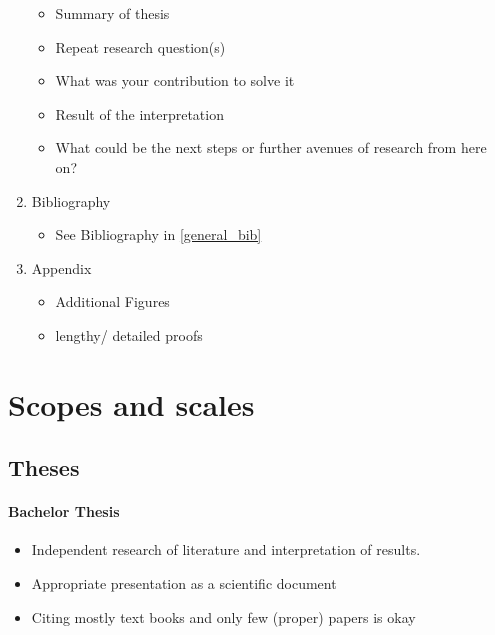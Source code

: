 \documentclass[nodate]{proc}
\begin{document}
\begin{enumerate}
\begin{itemize}
			\item Summary of thesis
			\item Repeat research question(s)
			\item What was your contribution to solve it
			\item Result of the interpretation
			\item What could be the next steps or further avenues of research from here on?
		\end{itemize}
	\item Bibliography
		\begin{itemize}
			\item See Bibliography in \ref{general_bib}
		\end{itemize}
	\item Appendix
		\begin{itemize}
			\item Additional Figures
			\item lengthy/ detailed proofs
		\end{itemize}
\end{enumerate}

\section{Scopes and scales}

\subsection{Theses}

\paragraph{Bachelor Thesis} \label{Scope BT}
\begin{itemize}
	\item Independent research of literature and interpretation of results. 
	\item Appropriate presentation as a scientific document
	\item Citing mostly text books and only few (proper) papers is okay
\end{itemize}
\end{document}
